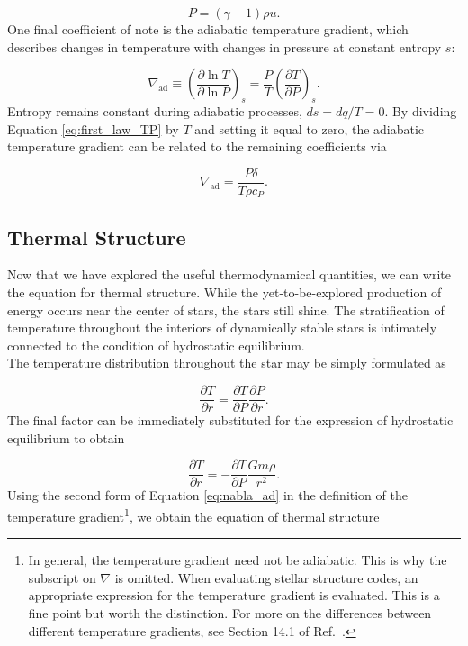 \documentclass[12pt]{article}
\newcommand{\pderiv}[2]{\frac{\partial #1}{\partial #2}}
\newcommand{\bigparenthesis}[1]{\left(#1\right)}
\begin{document}
\begin{equation}
    P = (\gamma - 1) \rho u. \label{eq:adiabaticGasLaw}
\end{equation}
%
One final coefficient of note is the adiabatic temperature gradient, which describes changes in temperature with changes in pressure at constant entropy $s$:

\begin{equation}
    \nabla_{\mathrm{ad}} \equiv \bigparenthesis{\pderiv{\ln T}{\ln P}}_s = \frac{P}{T}\bigparenthesis{\pderiv{T}{P}}_s. \label{eq:nabla_ad}
\end{equation}
%
Entropy remains constant during adiabatic processes, $ds = dq/T = 0$. By dividing Equation \ref{eq:first_law_TP} by $T$ and setting it equal to zero, the adiabatic temperature gradient can be related to the remaining coefficients via

\begin{equation}
    \nabla_\mathrm{ad} = \frac{P\delta}{T\rho c_P}.
\end{equation}

\subsection{Thermal Structure}
Now that we have explored the useful thermodynamical quantities, we can write the equation for thermal structure. While the yet-to-be-explored production of energy occurs near the center of stars, the stars still shine. The stratification of temperature throughout the interiors of dynamically stable stars is intimately connected to the condition of hydrostatic equilibrium. \\

The temperature distribution throughout the star may be simply formulated as 

\begin{equation}
    \pderiv{T}{r} = \pderiv{T}{P}\pderiv{P}{r}.
\end{equation}
%
The final factor can be immediately substituted for the expression of hydrostatic equilibrium to obtain

\begin{equation}
    \pderiv{T}{r} = -\pderiv{T}{P} \frac{Gm\rho}{r^2}.
\end{equation}
%
Using the second form of Equation \ref{eq:nabla_ad} in the definition of the temperature gradient\footnote{In general, the temperature gradient need not be adiabatic. This is why the subscript on $\nabla$ is omitted. When evaluating stellar structure codes, an appropriate expression for the temperature gradient is evaluated. This is a fine point but worth the distinction. For more on the differences between different temperature gradients, see Section 14.1 of Ref.~\cite{Cox_Giuli_vol1}.}, we obtain the equation of thermal structure
\end{document}
